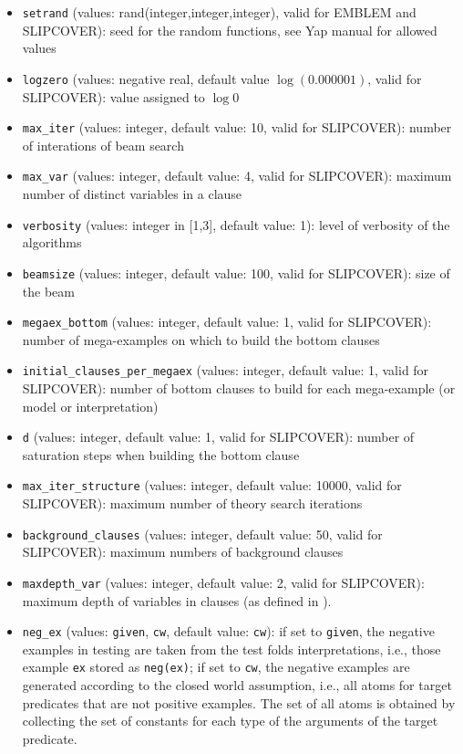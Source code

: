 \documentclass[a4paper,10pt]{article}
\begin{document}
\begin{itemize}
\item \verb|setrand| (values: rand(integer,integer,integer), valid for EMBLEM and SLIPCOVER): seed for the random functions, see Yap manual for allowed values
\item \verb|logzero| (values: negative real, default value $\log(0.000001)$, valid for SLIPCOVER): value assigned to $\log 0$
\item \verb|max_iter| (values: integer, default value: 10, valid for  SLIPCOVER): number of interations of beam search
\item \verb|max_var| (values: integer, default value: 4, valid for 
SLIPCOVER): maximum number of distinct variables in a clause
\item \verb|verbosity| (values: integer in [1,3], default value: 1): level of verbosity of the algorithms
\item \verb|beamsize|  (values: integer, default value: 100, valid for SLIPCOVER): size of the beam 
\item \verb|megaex_bottom| (values: integer, default value: 1, valid for SLIPCOVER): number of mega-examples on which to build the bottom clauses
\item \verb|initial_clauses_per_megaex| (values: integer, default value: 1, valid for SLIPCOVER): 
 number of bottom clauses to build for each mega-example (or 
 model or interpretation)
\item \verb|d| (values: integer, default value: 1, valid for SLIPCOVER): 
 number of saturation steps when building the bottom clause
\item \verb|max_iter_structure| (values: integer, default value: 10000, valid for SLIPCOVER): 
maximum  number of theory search iterations
\item \verb|background_clauses| (values: integer, default value: 50, valid for SLIPCOVER): 
 maximum numbers of background clauses
\item \verb|maxdepth_var| (values: integer, default value: 2, valid for SLIPCOVER): maximum depth of
variables in clauses (as defined in \cite{DBLP:journals/ai/Cohen95}).
\item \verb|neg_ex| (values:  \verb|given|, \verb|cw|, default value: \verb|cw|): if  set to \verb|given|, the negative examples in testing
are taken from the test folds interpretations, i.e., those example \verb|ex| stored as \verb|neg(ex)|; if set to \verb|cw|, the negative examples are generated according to the closed world assumption, i.e., all atoms for target predicates that are not positive examples. The set of all atoms is obtained by collecting the set of constants for each type of the arguments of the target predicate.
\end{itemize}
\end{document}
